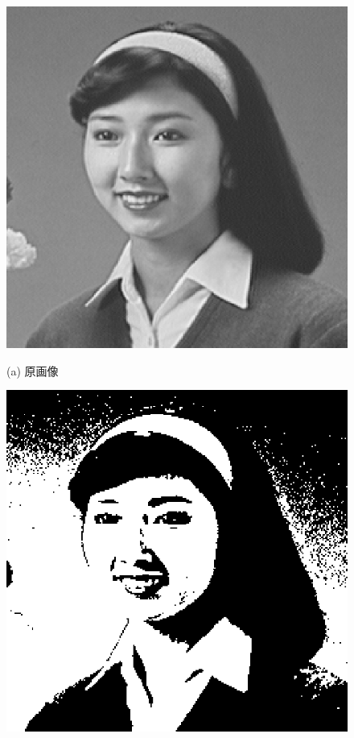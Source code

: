 \begin{figure}[H]
\begin{center}
\begin{minipage}{.38\textwidth}
\begin{center}
\includegraphics[width=.98\textwidth]{fig/hair1.eps}

(a) 原画像
\end{center}
\end{minipage}
\begin{minipage}{.38\textwidth}
\begin{center}
\includegraphics[width=.98\textwidth]{fig/hair1_bin.eps}


\end{center}
\end{minipage}
\end{center}
\end{figure}
